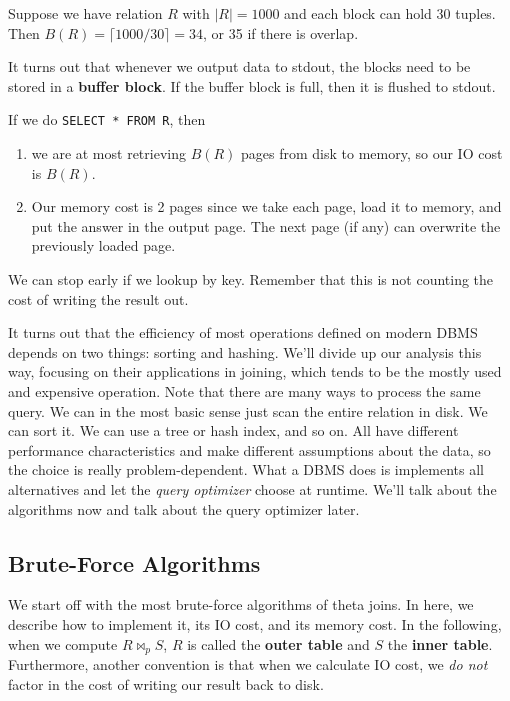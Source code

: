 \documentclass{article}
\begin{document}
    \begin{example}
      Suppose we have relation $R$ with $|R| = 1000$ and each block can hold 30 tuples. Then $B(R) = \lceil 1000 / 30 \rceil = 34$, or 35 if there is overlap. 
    \end{example}

    \begin{definition}
      It turns out that whenever we output data to stdout, the blocks need to be stored in a \textbf{buffer block}. If the buffer block is full, then it is flushed to stdout. 
    \end{definition}

    \begin{example}
      If we do \texttt{SELECT * FROM R}, then 
      \begin{enumerate}
        \item we are at most retrieving $B(R)$ pages from disk to memory, so our IO cost is $B(R)$. 
        \item Our memory cost is 2 pages since we take each page, load it to memory, and put the answer in the output page. The next page (if any) can overwrite the previously loaded page. 
      \end{enumerate}
      We can stop early if we lookup by key. Remember that this is not counting the cost of writing the result out. 
    \end{example}

    It turns out that the efficiency of most operations defined on modern DBMS depends on two things: sorting and hashing. We'll divide up our analysis this way, focusing on their applications in joining, which tends to be the mostly used and expensive operation. Note that there are many ways to process the same query. We can in the most basic sense just scan the entire relation in disk. We can sort it. We can use a tree or hash index, and so on. All have different performance characteristics and make different assumptions about the data, so the choice is really problem-dependent. What a DBMS does is implements all alternatives and let the \textit{query optimizer} choose at runtime. We'll talk about the algorithms now and talk about the query optimizer later. 

  \subsection{Brute-Force Algorithms}  

    We start off with the most brute-force algorithms of theta joins. In here, we describe how to implement it, its IO cost, and its memory cost. In the following, when we compute $R \bowtie_p S$, $R$ is called the \textbf{outer table} and $S$ the \textbf{inner table}. Furthermore, another convention is that when we calculate IO cost, we \textit{do not} factor in the cost of writing our result back to disk.  
\end{document}
